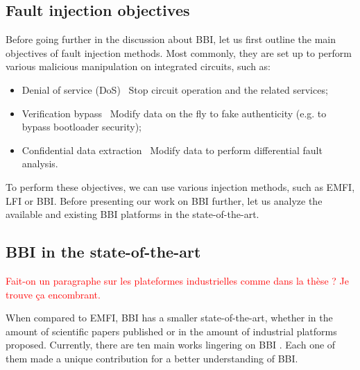 


	\subsection{Fault injection objectives}
		Before going further in the discussion about BBI, let us first outline the main objectives of fault injection methods.
		Most commonly, they are set up to perform various malicious manipulation on integrated circuits, such as:
		\begin{itemize}
			\item Denial of service (DoS) \textrightarrow\ Stop circuit operation and the related services;
			\item Verification bypass \textrightarrow\ Modify data on the fly to fake authenticity (e.g. to bypass bootloader security);
			\item Confidential data extraction \textrightarrow\ Modify data to perform differential fault analysis.
		\end{itemize}
		To perform these objectives, we can use various injection methods, such as EMFI, LFI or BBI.
		Before presenting our work on BBI further, let us analyze the available and existing BBI platforms in the state-of-the-art.

	\subsection{BBI in the state-of-the-art}
		\textcolor{red}{Fait-on un paragraphe sur les plateformes industrielles comme dans la thèse ? Je trouve ça encombrant.}

		When compared to EMFI, BBI has a smaller state-of-the-art, whether in the amount of scientific papers published or in the amount of industrial platforms proposed.
		Currently, there are ten main works lingering on BBI \cite{bbiOrigin, bbiSecond, bbiThird, bbiColin,japbbi, japbbi2, mybbiCosade, mybbiFdtc2022, mybbifdtc2023, colinFdtc2023}.
		Each one of them made a unique contribution for a better understanding of BBI.

